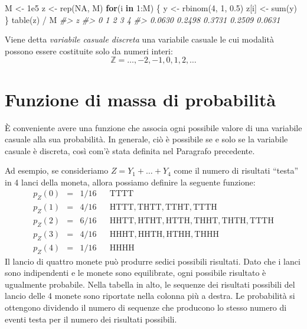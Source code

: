 \documentclass[
  10pt,
  italian,
  a4paper,
  extrafontsizes,onecolumn,openright
  ]{memoir}
\newenvironment{Shaded}{\begin{snugshade}}{\end{snugshade}}
\newcommand{\CommentTok}[1]{\textcolor[rgb]{0.56,0.35,0.01}{\textit{#1}}}
\newcommand{\ConstantTok}[1]{\textcolor[rgb]{0.00,0.00,0.00}{#1}}
\newcommand{\ControlFlowTok}[1]{\textcolor[rgb]{0.13,0.29,0.53}{\textbf{#1}}}
\newcommand{\DecValTok}[1]{\textcolor[rgb]{0.00,0.00,0.81}{#1}}
\newcommand{\FloatTok}[1]{\textcolor[rgb]{0.00,0.00,0.81}{#1}}
\newcommand{\FunctionTok}[1]{\textcolor[rgb]{0.00,0.00,0.00}{#1}}
\newcommand{\NormalTok}[1]{#1}
\newcommand{\OtherTok}[1]{\textcolor[rgb]{0.56,0.35,0.01}{#1}}
\newcommand{\SpecialCharTok}[1]{\textcolor[rgb]{0.00,0.00,0.00}{#1}}
\theoremstyle{definition}
\theoremstyle{definition}
\theoremstyle{definition}
\theoremstyle{definition}
\theoremstyle{remark}
\begin{document}
\begin{Shaded}
\begin{Highlighting}[]
\NormalTok{M }\OtherTok{\textless{}{-}} \FloatTok{1e5}
\NormalTok{z }\OtherTok{\textless{}{-}} \FunctionTok{rep}\NormalTok{(}\ConstantTok{NA}\NormalTok{, M)}
\ControlFlowTok{for}\NormalTok{(i }\ControlFlowTok{in} \DecValTok{1}\SpecialCharTok{:}\NormalTok{M) \{}
\NormalTok{  y }\OtherTok{\textless{}{-}} \FunctionTok{rbinom}\NormalTok{(}\DecValTok{4}\NormalTok{, }\DecValTok{1}\NormalTok{, }\FloatTok{0.5}\NormalTok{)}
\NormalTok{  z[i] }\OtherTok{\textless{}{-}} \FunctionTok{sum}\NormalTok{(y)}
\NormalTok{\}}
\FunctionTok{table}\NormalTok{(z) }\SpecialCharTok{/}\NormalTok{ M}
\CommentTok{\#\textgreater{} z}
\CommentTok{\#\textgreater{}      0      1      2      3      4 }
\CommentTok{\#\textgreater{} 0.0630 0.2498 0.3731 0.2509 0.0631}
\end{Highlighting}
\end{Shaded}

Viene detta \emph{variabile casuale discreta} una variabile casuale le cui modalità possono essere costituite solo da numeri interi:
\[
\mathbb{Z} = \dots, -2, -1, 0, 1, 2, \dots
\]

\hypertarget{sec:fun-mass-prob}{%
\section{Funzione di massa di probabilità}\label{sec:fun-mass-prob}}

È conveniente avere una funzione che associa ogni possibile valore di una variabile casuale alla sua probabilità. In generale, ciò è possibile se e solo se la variabile casuale è discreta, così com'è stata definita nel Paragrafo precedente.

Ad esempio, se consideriamo \(Z = Y_1 + \dots + Y_4\) come il numero di risultati ``testa'' in 4 lanci della moneta, allora possiamo definire la seguente funzione:
\[
\begin{array}{rclll}
p_Z(0) & = & 1/16 & & \mathrm{TTTT}
\\
p_Z(1) & = & 4/16 & & \mathrm{HTTT, THTT, TTHT, TTTH}
\\
p_Z(2) & = & 6/16 & & \mathrm{HHTT, HTHT, HTTH, THHT, THTH, TTTH}
\\
p_Z(3) & = & 4/16 & & \mathrm{HHHT, HHTH, HTHH, THHH}
\\
p_Z(4) & = & 1/16 & & \mathrm{HHHH}
\end{array}
\]
Il lancio di quattro monete può produrre sedici possibili risultati. Dato che i lanci sono indipendenti e le monete sono equilibrate, ogni possibile risultato è ugualmente probabile. Nella tabella in alto, le sequenze dei risultati possibili del lancio delle 4 monete sono riportate nella colonna più a destra. Le probabilità si ottengono dividendo il numero di sequenze che producono lo stesso numero di eventi testa per il numero dei risultati possibili.
\end{document}
